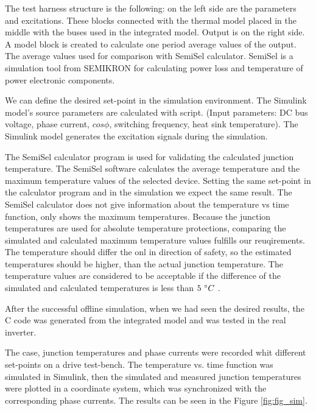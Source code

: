The test harness structure is the following: on the left side are the parameters and excitations. These blocks connected with the thermal model placed in the middle with the buses used in the integrated model. Output is on the right side. A model block is created to calculate one period average values of the output. The average values used for comparison with SemiSel calculator. SemiSel is a simulation tool from SEMIKRON for calculating power loss and temperature of power electronic components.

We can define the desired set-point in the simulation environment. The Simulink model's source parameters are calculated with script. (Input parameters: DC bus voltage, phase current, $cos\phi{}$, switching frequency, heat sink temperature). The Simulink model generates the excitation signals during the simulation.

The SemiSel calculator program is used for validating the calculated junction temperature. The SemiSel software calculates the average temperature and the maximum temperature values of the selected device. Setting the same set-point in the calculator program and in the simulation we expect the same result. The  SemiSel calculator does not give information about the temperature vs time function, only shows the maximum temperatures. Because the junction temperatures are used for absolute temperature protections, comparing the simulated and calculated maximum temperature values fulfills our reuqirements. The temperature should differ the onl in direction of safety, so the estimated temperatures should be higher, than the actual junction temperature. The temperature values are considered to be acceptable if the difference of the simulated and calculated temperatures is less than $5\ \degree{}C$ .

After the successful offline simulation, when we had seen the desired results, the C code was generated from the integrated model and was tested in the real inverter.

The case, junction temperatures and phase currents were recorded whit different set-points on a drive test-bench. The temperature vs. time function was simulated in Simulink, then the simulated and measured junction temperatures were  plotted in a coordinate system, which was synchronized with the corresponding phase currents. The results can be seen in the Figure \ref{fig:fig_sim}.

